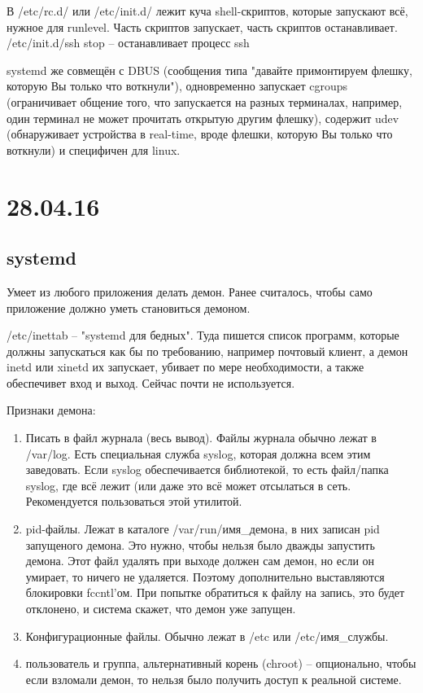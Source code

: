 \documentclass[a4paper,10pt]{article}
\begin{document}
\begin{enumerate}
В /etc/rc.d/ или /etc/init.d/ лежит куча shell-скриптов, которые запускают всё, нужное для runlevel. Часть скриптов запускает, часть скриптов останавливает.
/etc/init.d/ssh stop -- останавливает процесс ssh

systemd же совмещён с DBUS (сообщения типа "давайте примонтируем флешку, которую Вы только что воткнули"), одновременно запускает cgroups (ограничивает общение того, что запускается на разных терминалах, например, один терминал не может прочитать открытую другим флешку), содержит udev (обнаруживает устройства в real-time, вроде флешки, которую Вы только что воткнули) и специфичен для linux.


\end{enumerate}


\section{28.04.16}
\subsection{systemd}
Умеет из любого приложения делать демон.
Ранее считалось, чтобы само приложение должно уметь становиться демоном.

/etc/inettab -- "systemd для бедных". Туда пишется список программ, которые должны запускаться как бы по требованию, например почтовый клиент, а демон inetd или xinetd их запускает, убивает по мере необходимости, а также обеспечивет вход и выход. Сейчас почти не используется.

Признаки демона:
\begin{enumerate}
 \item Писать в файл журнала (весь вывод). Файлы журнала обычно лежат в /var/log.
 Есть специальная служба syslog, которая должна всем этим заведовать. Если syslog обеспечивается библиотекой, то есть файл/папка syslog, где всё лежит (или даже это всё может отсылаться в сеть. Рекомендуется пользоваться этой утилитой.
 \item pid-файлы. Лежат в каталоге /var/run/имя\_демона, в них записан pid запущеного демона. Это нужно, чтобы нельзя было дважды запустить демона. Этот файл удалять при выходе должен сам демон, но если он умирает, то ничего не удаляется. Поэтому дополнительно выставляются блокировки fccntl'ом. При попытке обратиться к файлу на запись, это будет отклонено, и система скажет, что демон уже запущен.
 \item Конфигурационные файлы. Обычно лежат в /etc или /etc/имя\_службы.
 \item пользователь и группа, альтернативный корень (chroot) -- опционально, чтобы если взломали демон, то нельзя было получить доступ к реальной системе.
\end{enumerate}
\end{document}
